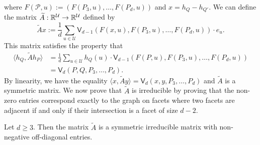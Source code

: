 \documentclass{puthesis-UG}
\begin{document}
where $F(\mathcal{P}, u) := (F(P_3, u), \ldots, F(P_d, u))$ and $x = h_Q - h_{Q'}$. We can define the matrix $\widetilde{A} : \mathbb{R}^\mathcal{U} \to \mathbb{R}^{\mathcal{U}}$ defined by 
\[
	\widetilde{A} x := \frac{1}{d} \sum_{u \in \mathcal{U}} \mathsf{V}_{d-1} (F(x, u), F(P_3, u), \ldots, F(P_d, u)) \cdot e_u.
\]
This matrix satisfies the property that 
\begin{align*}
	\langle h_Q, \widetilde{A} h_P \rangle & = \frac{1}{d} \sum_{u \in \mathcal{U}} h_Q(u) \cdot \mathsf{V}_{d-1} (F(P, u), F(P_3, u), \ldots, F(P_d, u)) \\
	& = \mathsf{V}_d (P, Q, P_3, \ldots, P_d).
\end{align*}
By linearity, we have the equality $\langle x, \widetilde{A} y \rangle = \mathsf{V}_d (x, y, P_3, \ldots, P_d)$ and $\widetilde{A}$ is a symmetric matrix. We now prove that $\widetilde{A}$ is irreducible by proving that the non-zero entries correspond exactly to the graph on facets where two facets are adjacent if and only if their intersection is a facet of size $d-2$. 

\begin{lem} \label{lemma-structure-of-matrix-widetilde-A}
	Let $d \geq 3$. Then the matrix $\widetilde{A}$ is a symmetric irreducible matrix with non-negative off-diagonal entries. 	
\end{lem}
\end{document}
